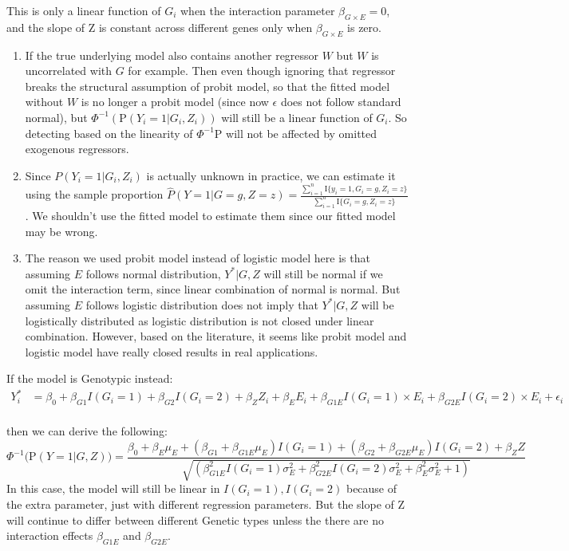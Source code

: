 \documentclass[
]{article}
\begin{document}
This is only a linear function of \(G_i\) when the interaction parameter
\(\beta_{G\times E} = 0\), and the slope of Z is constant across
different genes only when \(\beta_{G\times E}\) is zero.

\begin{enumerate}
\item If the true underlying model also contains another regressor $W$ but $W$ is uncorrelated with $G$ for example. Then even though ignoring that regressor breaks the structural assumption of probit model, so that the fitted model without $W$ is no longer a probit model (since now $\epsilon$ does not follow standard normal), but $\Phi^{-1}(\text{P}(Y_i = 1|G_i,Z_i))$ will still be a linear function of $G_i$. So detecting based on the linearity of $\Phi^{-1}\text{P}$ will not be affected by omitted exogenous regressors.
\item Since $P(Y_i = 1|G_i,Z_i)$ is actually unknown in practice, we can estimate it using the sample proportion $\hat{P}(Y = 1|G = g,Z = z) = \frac{\sum_{i=1}^{n} \text{I}\{y_i =1,G_{i} = g, Z_{i} = z\}}{\sum_{i=1}^{n}  \text{I}\{G_{i} = g, Z_{i} = z\}}$. We shouldn't use the fitted model to estimate them since our fitted model may be wrong.
\item The reason we used probit model instead of logistic model here is that assuming $E$ follows normal distribution, $Y^*|G,Z$ will still be normal if we omit the interaction term, since linear combination of normal is normal. But assuming $E$ follows logistic distribution does not imply that $Y^*|G,Z$ will be logistically distributed as logistic distribution is not closed under linear combination. However, based on the literature, it seems like probit model and logistic model have really closed results in real applications.
\end{enumerate}

If the model is Genotypic instead: \begin{equation}\label{eqn:genointer}
\begin{aligned}
Y_i^* &= \beta_0 + \beta_{G1} I(G_i = 1) + \beta_{G2} I(G_i = 2) + \beta_Z Z_i + \beta_E E_i + \beta_{G1E} I(G_i = 1) \times E_i + \beta_{G2E} I(G_i = 2) \times E_i  + \epsilon_i \\
\end{aligned}
\end{equation}

then we can derive the following:
\[\Phi^{-1} \bigg(\text{P}(Y = 1 | G, Z) \bigg) = \frac{\beta_0+\beta_E \mu_E+(\beta_{G1} + \beta_{G1E} \mu_E)I(G_i = 1)+(\beta_{G2} + \beta_{G2E} \mu_E)I(G_i = 2) + \beta_Z Z}{\sqrt{(\beta_{G1E}^2 I(G_i = 1) \sigma_E^2 +\beta_{G2E}^2 I(G_i = 2) \sigma_E^2 + \beta_E^2 \sigma_E^2 + 1)}} \]
In this case, the model will still be linear in
\(I(G_i = 1), I(G_i = 2)\) because of the extra parameter, just with
different regression parameters. But the slope of Z will continue to
differ between different Genetic types unless the there are no
interaction effects \(\beta_{G1E}\) and \(\beta_{G2E}\).
\end{document}
